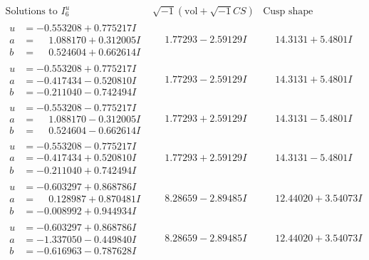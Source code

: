 \documentclass[1p]{elsarticle_modified}
\theoremstyle{definition}
\newcommand{\I}{\sqrt{-1}}
\begin{document}
$$\begin{array}{c|c|c}  
\text{Solutions to }I^u_{6}& \I (\text{vol} + \sqrt{-1}CS) & \text{Cusp shape}\\
 \hline 
\begin{aligned}
u &= -0.553208 + 0.775217 I \\
a &= \phantom{-}1.088170 + 0.312005 I \\
b &= \phantom{-}0.524604 + 0.662614 I\end{aligned}
 & \phantom{-}1.77293 - 2.59129 I & \phantom{-}14.3131 + 5.4801 I \\ \hline\begin{aligned}
u &= -0.553208 + 0.775217 I \\
a &= -0.417434 - 0.520810 I \\
b &= -0.211040 - 0.742494 I\end{aligned}
 & \phantom{-}1.77293 - 2.59129 I & \phantom{-}14.3131 + 5.4801 I \\ \hline\begin{aligned}
u &= -0.553208 - 0.775217 I \\
a &= \phantom{-}1.088170 - 0.312005 I \\
b &= \phantom{-}0.524604 - 0.662614 I\end{aligned}
 & \phantom{-}1.77293 + 2.59129 I & \phantom{-}14.3131 - 5.4801 I \\ \hline\begin{aligned}
u &= -0.553208 - 0.775217 I \\
a &= -0.417434 + 0.520810 I \\
b &= -0.211040 + 0.742494 I\end{aligned}
 & \phantom{-}1.77293 + 2.59129 I & \phantom{-}14.3131 - 5.4801 I \\ \hline\begin{aligned}
u &= -0.603297 + 0.868786 I \\
a &= \phantom{-}0.128987 + 0.870481 I \\
b &= -0.008992 + 0.944934 I\end{aligned}
 & \phantom{-}8.28659 - 2.89485 I & \phantom{-}12.44020 + 3.54073 I \\ \hline\begin{aligned}
u &= -0.603297 + 0.868786 I \\
a &= -1.337050 - 0.449840 I \\
b &= -0.616963 - 0.787628 I\end{aligned}
 & \phantom{-}8.28659 - 2.89485 I & \phantom{-}12.44020 + 3.54073 I \\ \hline\begin{aligned}

\end{aligned}
\end{array}$$
\end{document}
